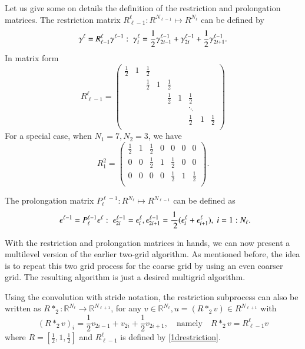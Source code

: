 Let us give some on details the definition of the restriction and
prolongation matrices.  The restriction matrix $R_{\ell-1}^\ell: R^{N_{\ell-1}}
\mapsto R^{N_{\ell}}$ can be defined by
\begin{equation}\Label{restrictk}
\gamma^{\ell}=R_{\ell-1}^\ell\gamma^{\ell-1}: \;
\gamma^{\ell}_i={1\over2}\gamma^{\ell-1}_{2i-1}+\gamma^{\ell-1}_{2i}+{1\over2}\gamma^{\ell-1}_{2i+1}.
\end{equation}
In matrix form 
\begin{equation}
\label{1drestriction}
R_{\ell-1}^\ell=\left(
\begin{array}{ccccccccc}
\frac{1}{2}& 1&\frac{1}{2}&&&&&&\\
&&\frac{1}{2}&1&\frac{1}{2}&&&&\\
&&&&\frac{1}{2}&1&\frac{1}{2}&&\\
&&&&&&\ddots&&\\
&&&&&&\frac{1}{2}&1&\frac{1}{2}\\
\end{array}
\right)
\end{equation}
For a special case, when $N_1=7, N_2=3$, we have 
\begin{equation}
\label{1drestriction3}
R_1^2=\left(
\begin{array}{ccccccc}
\frac{1}{2}& 1&\frac{1}{2}&0&0&0&0\\
0&0&\frac{1}{2}&1&\frac{1}{2}&0&0\\
0&0&0&0&\frac{1}{2}&1&\frac{1}{2}\\
\end{array}
\right).
\end{equation}




The prolongation matrix
$P_{\ell}^{\ell-1}: R^{N_{\ell}}
\mapsto R^{N_{\ell-1}}$ can be defined as 
\begin{equation}\Label{prolongk}
~~\epsilon^{\ell-1}=P^{\ell-1}_{\ell}\epsilon^{\ell}: \; \epsilon^{\ell-1}_{2i}=\epsilon^{\ell}_i, \epsilon^{\ell-1}_{2i+1}
= {1\over~2}(\epsilon^{\ell}_i+\epsilon^{\ell}_{i+1}), \; i=1:N_{\ell}.
\end{equation}

With the restriction and prolongation matrices in hands, we can now
present a multilevel version of the earlier two-grid algorithm.  As
mentioned before, the idea is to repeat this two grid process for the
coarse grid by using an even coarser grid.  The resulting algorithm is
just a desired multigrid algorithm. 


Using the convolution with stride notation, the restriction subprocess can also be written as 
$R\ast_2: \mathbb R^{N_\ell}\rightarrow  \mathbb R^{N_{\ell+1}}$, for any $v\in \mathbb R^{N_\ell}, u=(R\ast_2 v)\in R^{N_{\ell+1}}$ with
$$
 (R\ast_2 v)_i=\frac 12 v_{2i-1} +v_{2i}+\frac 12 v_{2i+1},\quad  \mbox{namely}\quad R\ast_2v=R_{\ell-1}^\ell v
$$
where $R=[\frac 12,1,\frac12]$ and $R_{\ell-1}^\ell $ is defined by \eqref{1drestriction}.

